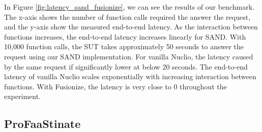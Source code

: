 In Figure \ref{fig:latency_sand_fusionize}, we can see the results of our
benchmark. The x-axis shows the number of function calls required the answer the
request, and the y-axis show the measured end-to-end latency. As the interaction
between functions increases, the end-to-end latency increases linearly for SAND.
With 10,000 function calls, the SUT takes approximately 50 seconds to answer the
request using our SAND implementation. For vanilla Nuclio, the latency caused by
the same request if significantly lower at below 20 seconds. The end-to-end
latency of vanilla Nuclio scales exponentially with increasing interaction
between functions. With Fusionize, the latency is very close to 0 throughout the
experiment.

\subsection{ProFaaStinate}
